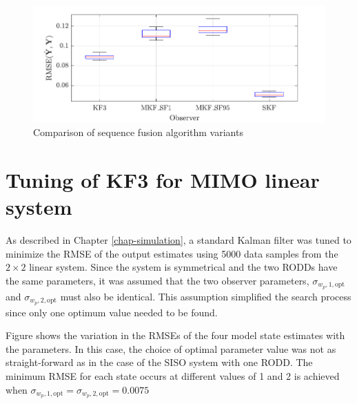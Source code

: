 \begin{figure}[htp]
	\centering
	\includegraphics[width=12cm]{images/rod_obs_sim1_all_seed_y_err_box_SF95.pdf}
	\caption{Comparison of sequence fusion algorithm variants}
	\label{fig:rod-obs-sim1-yest-all-seed-RMSE-box}
\end{figure}



\section{Tuning of KF3 for MIMO linear system}

As described in Chapter \ref{chap-simulation}, a standard Kalman filter was tuned to minimize the RMSE of the output estimates using 5000 data samples from the $2\times2$ linear system. Since the system is symmetrical and the two RODDs have the same parameters, it was assumed that the two observer parameters, $\sigma_{w_p,1,\text{opt}}$ and $\sigma_{w_p,2,\text{opt}}$ must also be identical. This assumption simplified the search process since only one optimum value needed to be found.

Figure \label{fig:sim-sys-2x2-KF3-tuning} shows the variation in the RMSEs of the four model state estimates with the parameters. In this case, the choice of optimal parameter value was not as straight-forward as in the case of the SISO system with one RODD. The minimum RMSE for each state occurs at different values of  1 and 2 is achieved when $\sigma_{w_p,1,\text{opt}}=\sigma_{w_p,2,\text{opt}}=0.0075$

